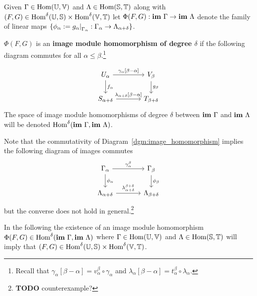 \begin{definition}
  Given $\Gamma\in\mathrm{Hom}(\mathbb{U},\mathbb{V})$ and $\Lambda\in\mathrm{Hom}(\mathbb{S},\mathbb{T})$ along with $(F,G)\in\mathrm{Hom}^\delta(\mathbb{U},\mathbb{S})\times\mathrm{Hom}^\delta(\mathbb{V},\mathbb{T})$ let $\Phi(F, G) : \mathbf{im}~\Gamma\to\mathbf{im}~\Lambda$ denote the family of linear maps $\{\phi_\alpha := g_\alpha\mathord{\mid}_{\Gamma_\alpha} : \Gamma_\alpha\to\Lambda_{\alpha+\delta}\}$.

  $\Phi(F, G)$ is an \textbf{image module homomorphism of degree $\delta$} if the following diagram commutes for all $\alpha\leq\beta$.\footnote{Recall that $\gamma_\alpha[\beta-\alpha] = v_\alpha^\beta\circ\gamma_\alpha$ and $\lambda_\alpha[\beta-\alpha] = t_\alpha^\beta\circ\lambda_\alpha$.}

  \begin{equation}\label{dgm:image_homomorphism}
    \begin{tikzcd}[column sep=large]
        U_\alpha\arrow{r}{\gamma_\alpha[\beta-\alpha]}\arrow{d}{f_\alpha} &
      V_\beta\arrow{d}{g_\beta}\\
      S_{\alpha+\delta}\arrow{r}{\lambda_{\alpha+\delta}[\beta-\alpha]} &
      T_{\beta +\delta}
  \end{tikzcd}\end{equation}
  The space of image module homomorphisms of degree $\delta$ between $\mathbf{im}~\Gamma$ and $\mathbf{im}~\Lambda$ will be denoted $\mathrm{Hom}^\delta(\mathbf{im}~\Gamma,\mathbf{im}~\Lambda)$.
\end{definition}

Note that the commutativity of Diagram~\ref{dgm:image_homomorphism} implies the following diagram of images commutes
\begin{equation}\label{dgm:shifted_homomorphism}
  \begin{tikzcd}[column sep=large]
    \Gamma_\alpha\arrow{r}{\gamma_\alpha^\beta}\arrow{d}{\phi_\alpha} &
    \Gamma_\beta\arrow{d}{\phi_\beta}\\
    \Lambda_{\alpha+\delta}\arrow{r}{\lambda_{\alpha+\delta}^{\beta+\delta}} &
    \Lambda_{\beta +\delta}
\end{tikzcd}\end{equation}
but the converse does not hold in general.\footnote{\textbf{TODO} counterexample?}

In the following the existence of an image module homomorphism $\Phi(F, G)\in\mathrm{Hom}^\delta(\mathbf{im}~\Gamma, \mathbf{im}~\Lambda)$ where $\Gamma\in\mathrm{Hom}(\mathbb{U},\mathbb{V})$ and $\Lambda\in\mathrm{Hom}(\mathbb{S},\mathbb{T})$  will imply that $(F,G)\in\mathrm{Hom}^\delta(\mathbb{U},\mathbb{S})\times \mathrm{Hom}^\delta(\mathbb{V},\mathbb{T})$.

